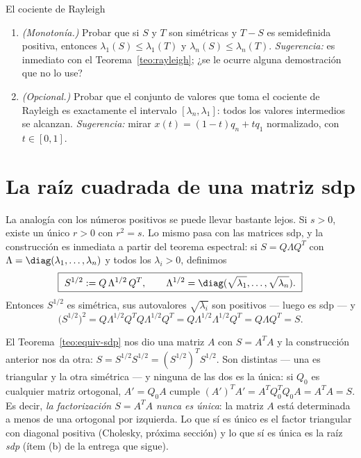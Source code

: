 \begin{entrega}{El cociente de Rayleigh}
\begin{enumerate}[label=\textbf{(\alph*)},itemsep=3pt,topsep=4pt]
\item \emph{(Monotonía.)} Probar que si $S$ y $T$ son simétricas y $T-S$ es
semidefinida positiva, entonces $\lambda_1(S)\le\lambda_1(T)$ y
$\lambda_n(S)\le\lambda_n(T)$. \emph{Sugerencia:} es inmediato con el
Teorema~\ref{teo:rayleigh}; ¿se le ocurre alguna demostración que no lo use?

\item \emph{(Opcional.)} Probar que el conjunto de valores que toma el
cociente de Rayleigh es exactamente el intervalo $[\lambda_n,\lambda_1]$:
todos los valores intermedios se alcanzan. \emph{Sugerencia:} mirar
$x(t)=(1-t)q_n+tq_1$ normalizado, con $t\in[0,1]$.
\end{enumerate}

\medskip
{}
\end{entrega}

\section{La raíz cuadrada de una matriz sdp}
\label{sec:raiz}

La analogía con los números positivos se puede llevar bastante lejos. Si
$s>0$, existe un único $r>0$ con $r^2=s$. Lo mismo pasa con las matrices sdp,
y la construcción es inmediata a partir del teorema espectral: si
$S = Q\Lambda Q^T$ con $\Lambda=\diag(\lambda_1,\dots,\lambda_n)$ y todos los
$\lambda_i>0$, definimos
\[
\boxed{\ S^{1/2} := Q\,\Lambda^{1/2}\,Q^T,
\qquad \Lambda^{1/2}=\diag(\sqrt{\lambda_1},\dots,\sqrt{\lambda_n}).\ }
\]
Entonces $S^{1/2}$ es simétrica, sus autovalores $\sqrt{\lambda_i}$ son
positivos --- luego es sdp --- y
\[
\big(S^{1/2}\big)^2 = Q\Lambda^{1/2}Q^TQ\Lambda^{1/2}Q^T
= Q\Lambda^{1/2}\Lambda^{1/2}Q^T = Q\Lambda Q^T = S .
\]

\begin{remark}[Dos factorizaciones $S=A^TA$ distintas]\label{obs:dos-raices}
El Teorema~\ref{teo:equiv-sdp} nos dio una matriz $A$ con $S=A^TA$ y la
construcción anterior nos da otra: $S = S^{1/2}S^{1/2} = (S^{1/2})^TS^{1/2}$.
Son distintas --- una es triangular y la otra simétrica --- y ninguna de las
dos es la única: si $Q_0$ es cualquier matriz ortogonal, $A'=Q_0A$ cumple
$(A')^TA' = A^TQ_0^TQ_0A = A^TA = S$. Es decir, \emph{la factorización
$S=A^TA$ nunca es única}: la matriz $A$ está determinada a menos de una
ortogonal por izquierda. Lo que sí es único es el factor triangular con
diagonal positiva (Cholesky, próxima sección) y lo que sí es única es la
raíz \emph{sdp} (ítem (b) de la entrega que sigue).
\end{remark}

